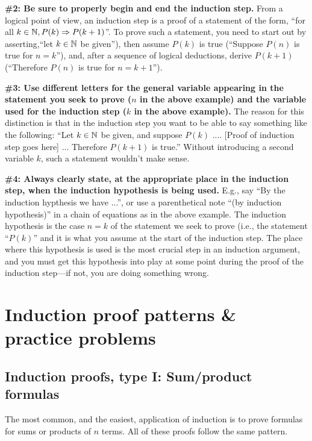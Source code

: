 \noindent
\textbf{\#2: Be sure to properly begin and end the induction step.} 
From a logical point of view, an induction step is a proof of a statement of the
form, ``for all  $ k\in\mathbb{N}, P(k)\Rightarrow P(k+1)$''. To prove such a statement,
you need to start out by asserting,``let $k\in \mathbb{N}$ be
given''), then assume $P(k)$ is true (``Suppose $P(n)$ is true for $n=k$''), 
and, after a sequence of logical deductions, derive $P(k+1)$ (``Therefore
$P(n)$ is true for $n=k+1$''). 

\noindent
 \textbf{\#3: Use different letters for the general variable appearing in the
statement you seek to prove ($n$ in the above example)
and the variable used for the induction step 
($k$ in the above example).} 
The reason for this distinction is that in the induction step 
you want to be able to say something like the following:
``Let $k\in\mathbb{N}$ be given, and suppose $P(k)$ .... 
[Proof of induction step goes here] ...  
Therefore $P(k+1)$ is true.''  Without introducing a second variable
$k$, such a statement wouldn't make sense.

\noindent
\textbf{\#4: Always clearly state, at the appropriate place in the induction step,
when the induction hypothesis is being used.} E.g., say
``By the induction hypthesis we have ...'', or use a parenthetical
note ``(by induction hypothesis)'' in a chain of equations as in the above
example.  The induction hypothesis is the case $n=k$ of the statement we seek
to prove (i.e., the statement ``$P(k)$'' and it is what you assume at the
start of the induction step.  The place where this hypothesis is used is the
most crucial step in an induction argument, and you must get this hypothesis into
play at some point during the proof of the induction step---if not, you are
doing something wrong. 


\section{Induction proof patterns \& practice problems} 



\subsection*{Induction proofs, type I: Sum/product formulas}
 
The most common, and the easiest, application of induction is to prove
formulas for sums or products of $n$ terms.  All of these proofs follow
the same pattern.
\medskip

